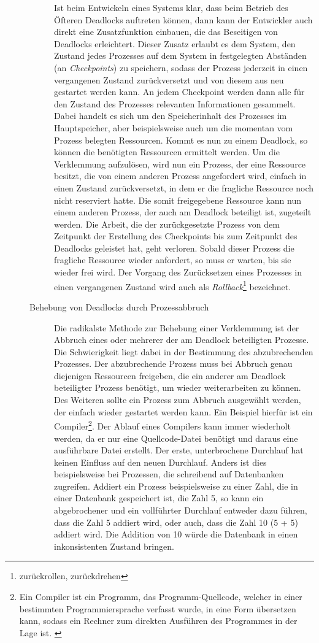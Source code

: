 \begin{description}
\begin{description}
								Ist beim Entwickeln eines Systems klar, dass beim Betrieb des Öfteren Deadlocks auftreten können, dann kann der Entwickler auch direkt eine Zusatzfunktion einbauen, die das Beseitigen von Deadlocks erleichtert. Dieser Zusatz erlaubt es dem System, den Zustand jedes Prozesses auf dem System in festgelegten Abständen (an \textit{Checkpoints}) zu speichern, sodass der Prozess jederzeit in einen vergangenen Zustand zurückversetzt und von diesem aus neu gestartet werden kann. An jedem Checkpoint werden dann alle für den Zustand des Prozesses relevanten Informationen gesammelt. Dabei handelt es sich um den Speicherinhalt des Prozesses im Hauptspeicher, aber beispielsweise auch um die momentan vom Prozess belegten Ressourcen.
								Kommt es nun zu einem Deadlock, so können die benötigten Ressourcen ermittelt werden. Um die Verklemmung aufzulösen, wird nun ein Prozess, der eine Ressource besitzt, die von einem anderen Prozess angefordert wird, einfach in einen Zustand zurückversetzt, in dem er die fragliche Ressource noch nicht reserviert hatte. Die somit freigegebene Ressource kann nun einem anderen Prozess, der auch am Deadlock beteiligt ist, zugeteilt werden. Die Arbeit, die der zurückgesetzte Prozess von dem Zeitpunkt der Erstellung des Checkpoints bis zum Zeitpunkt des Deadlocks geleistet hat, geht verloren. Sobald dieser Prozess die fragliche Ressource wieder anfordert, so muss er warten, bis sie wieder frei wird. Der Vorgang des Zurücksetzen eines Prozesses in einen vergangenen Zustand wird auch als \textit{Rollback}\footnote{zurückrollen, zurückdrehen} bezeichnet.
								
							\item[Behebung von Deadlocks durch Prozessabbruch]
							
								Die radikalste Methode zur Behebung einer Verklemmung ist der Abbruch eines oder mehrerer der am Deadlock beteiligten Prozesse. Die Schwierigkeit liegt dabei in der Bestimmung des abzubrechenden Prozesses. Der abzubrechende Prozess muss bei Abbruch genau diejenigen Ressourcen freigeben, die ein anderer am Deadlock beteiligter Prozess benötigt, um wieder weiterarbeiten zu können. Des Weiteren sollte ein Prozess zum Abbruch ausgewählt werden, der einfach wieder gestartet werden kann. Ein Beispiel hierfür ist ein Compiler\footnote{Ein Compiler ist ein Programm, das Programm-Quellcode, welcher in einer bestimmten Programmiersprache verfasst wurde, in eine Form übersetzen kann, sodass ein Rechner zum direkten Ausführen des Programmes in der Lage ist. \cite{CompilerWikipedia}}. Der Ablauf eines Compilers kann immer wiederholt werden, da er nur eine Quellcode-Datei benötigt und daraus eine ausführbare Datei erstellt. Der erste, unterbrochene Durchlauf hat keinen Einfluss auf den neuen Durchlauf. Anders ist dies beispielsweise bei Prozessen, die schreibend auf Datenbanken zugreifen. Addiert ein Prozess beispielsweise zu einer Zahl, die in einer Datenbank gespeichert ist, die Zahl 5, so kann ein abgebrochener und ein vollführter Durchlauf entweder dazu führen, dass die Zahl 5 addiert wird, oder auch, dass die Zahl 10 (5 + 5) addiert wird. Die Addition von 10 würde die Datenbank in einen inkonsistenten Zustand bringen. \cite{ModerneBetriebssysteme}
										

\end{description}
\end{description}
